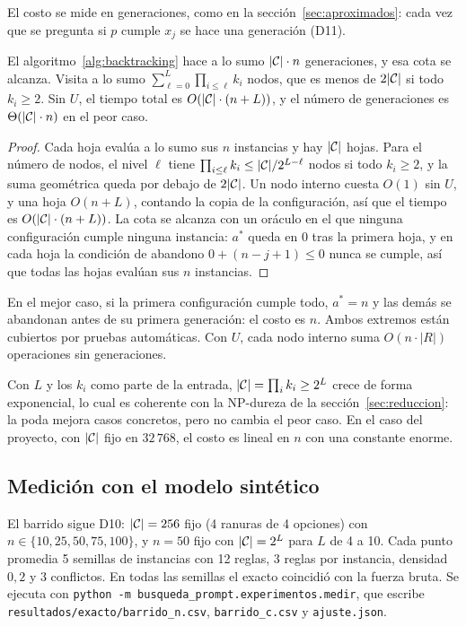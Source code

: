 El costo se mide en generaciones, como en la sección~\ref{sec:aproximados}: cada vez que se
pregunta si $p$ cumple $x_j$ se hace una generación (D11).

\begin{teorema}[Costo]\label{teo:exacto-costo}
El algoritmo~\ref{alg:backtracking} hace a lo sumo $|\mathcal{C}|\cdot n$ generaciones, y esa cota
se alcanza. Visita a lo sumo $\sum_{\ell=0}^{L}\prod_{i\le\ell}k_i$ nodos, que es menos de
$2|\mathcal{C}|$ si todo $k_i\ge2$. Sin $U$, el tiempo total es $O(|\mathcal{C}|\cdot(n+L))$, y el
número de generaciones es $\Theta(|\mathcal{C}|\cdot n)$ en el peor caso.
\end{teorema}
\begin{proof}
Cada hoja evalúa a lo sumo sus $n$ instancias y hay $|\mathcal{C}|$ hojas. Para el número de nodos,
el nivel $\ell$ tiene $\prod_{i\le\ell}k_i\le|\mathcal{C}|/2^{L-\ell}$ nodos si todo $k_i\ge2$, y la
suma geométrica queda por debajo de $2|\mathcal{C}|$. Un nodo interno cuesta $O(1)$ sin $U$, y una
hoja $O(n+L)$, contando la copia de la configuración, así que el tiempo es
$O(|\mathcal{C}|\cdot(n+L))$. La cota se alcanza con un oráculo en el
que ninguna configuración cumple ninguna instancia: $a^*$ queda en $0$ tras la primera hoja,
y en cada hoja la condición de abandono $0+(n-j+1)\le0$ nunca se cumple, así que todas las
hojas evalúan sus $n$ instancias.
\end{proof}

En el mejor caso, si la primera configuración cumple todo, $a^*=n$ y las demás se abandonan
antes de su primera generación: el costo es $n$. Ambos extremos están cubiertos por pruebas
automáticas. Con $U$, cada nodo interno suma $O(n\cdot|R|)$ operaciones sin generaciones.

Con $L$ y los $k_i$ como parte de la entrada, $|\mathcal{C}|=\prod_ik_i\ge2^L$ crece de forma
exponencial, lo cual es coherente con la NP-dureza de la sección~\ref{sec:reduccion}: la poda
mejora casos concretos, pero no cambia el peor caso. En el caso del proyecto, con $|\mathcal{C}|$
fijo en $32\,768$, el costo es lineal en $n$ con una constante enorme.

\subsection{Medición con el modelo sintético}

El barrido sigue D10: $|\mathcal{C}|=256$ fijo (4 ranuras de 4 opciones) con
$n\in\{10,25,50,75,100\}$, y $n=50$ fijo con $|\mathcal{C}|=2^L$ para $L$ de 4 a 10. Cada punto
promedia 5 semillas de instancias con 12 reglas, 3 reglas por instancia, densidad $0{,}2$ y 3
conflictos. En todas las semillas el exacto coincidió con la fuerza bruta. Se ejecuta con
\texttt{python -m busqueda\_prompt.experimentos.medir}, que escribe
\texttt{resultados/exacto/barrido\_n.csv}, \texttt{barrido\_c.csv} y \texttt{ajuste.json}.


